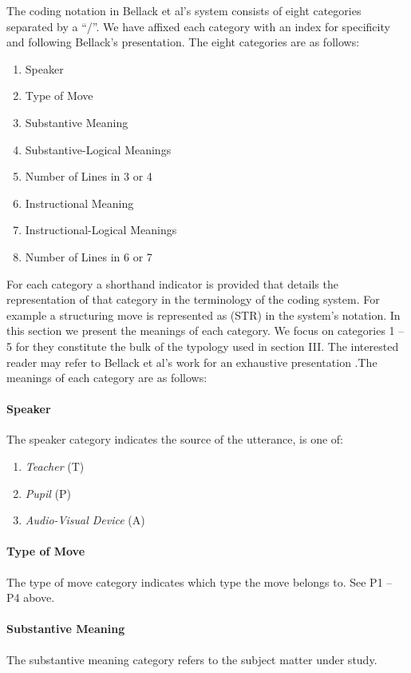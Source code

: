 \documentclass[conference]{IEEEtran}
\begin{document}
The coding notation in Bellack et al's system consists of eight categories
separated by a ``/''. We have affixed each category with an index for
specificity and following Bellack's presentation. The eight categories are as
follows:

\begin{enumerate}
  \item Speaker
  \item Type of Move
  \item Substantive Meaning
  \item Substantive-Logical Meanings
  \item Number of Lines in 3 or 4
  \item Instructional Meaning
  \item Instructional-Logical Meanings
  \item Number of Lines in 6 or 7
\end{enumerate}

For each category a shorthand indicator is provided that details the
representation of that category in the terminology of the coding system.
For example a structuring move is represented as (STR) in the system's
notation. In this section we present the meanings of each category. We focus on
categories 1 -- 5 for they constitute the bulk of the typology used in section
III. The interested reader may refer to Bellack et al's work for an
exhaustive presentation \cite{bellack1966language}.The meanings of each category are as follows:

\paragraph{Speaker}
The speaker category indicates the source of the utterance, is one of:
  \begin{enumerate}
    \item \emph{Teacher} (T)
    \item \emph{Pupil} (P)
    \item \emph{Audio-Visual Device} (A)
  \end{enumerate}
\paragraph{Type of Move}
The type of move category indicates which type the move
belongs to. See P1 -- P4 above.

\paragraph{Substantive Meaning}
The substantive meaning category refers to
the subject matter under study.
\end{document}
